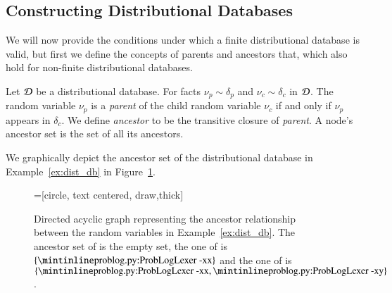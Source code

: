 \subsection{Constructing Distributional Databases}
\label{sec:fintiedistdb}


We will now provide the conditions under which a finite distributional database is valid, but first we define the concepts of parents and ancestors that, which also hold for non-finite distributional databases.
\begin{definition}
    \label{def:df_ancestor}
Let $\mathcal{D}$ be a distributional database. For facts $\nu_p\sim\delta_p$ and $\nu_c\sim\delta_c$  in $\mathcal{D}$.  The random variable $\nu_p$  is a \emph{parent} of the child random variable $\nu_c$ if and only if  $\nu_p$ appears in $\delta_c$. We define \emph{ancestor} to be the transitive closure of \emph{parent}. A node's ancestor set is the set of all its ancestors.
\end{definition}

\begin{example}
    We graphically depict the ancestor set of the distributional database in Example~\ref{ex:dist_db} in Figure~\ref{fig:ex:dist_db_ancestor}.

  
    \begin{figure}[h]
        \centering
    =[circle, text centered, draw,thick]
        \caption{Directed acyclic graph representing the ancestor relationship between the random variables in Example~\ref{ex:dist_db}. The ancestor set of  is the empty set, the one of  is $\{\mathprobloginline{x} \}$ and the one of  is $\{\mathprobloginline{x}, \mathprobloginline{y} \}$.}
        \label{fig:ex:dist_db_ancestor}
    \end{figure}

\end{example}





